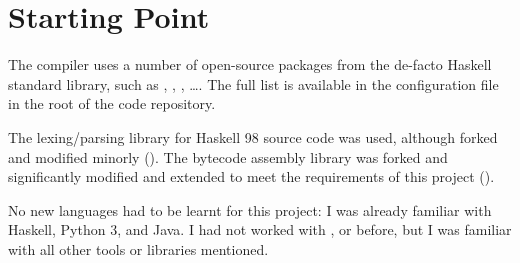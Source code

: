 \documentclass[dissertation.tex]{subfiles}
\begin{document}
\section{Starting Point}
{

    The compiler uses a number of open-source packages from the de-facto Haskell standard library, such as
    , , , \dots. The full list is available in the
     configuration file in the root of the code repository.

    The  lexing/parsing library for Haskell 98 source code was used, although forked and modified
    minorly (). The bytecode assembly library  was forked and significantly
    modified and extended to meet the requirements of this project ().

    No new languages had to be learnt for this project: I was already familiar with Haskell, Python 3, and Java. I had
    not worked with ,  or  before, but I was familiar
    with all other tools or libraries mentioned.

}
\end{document}
